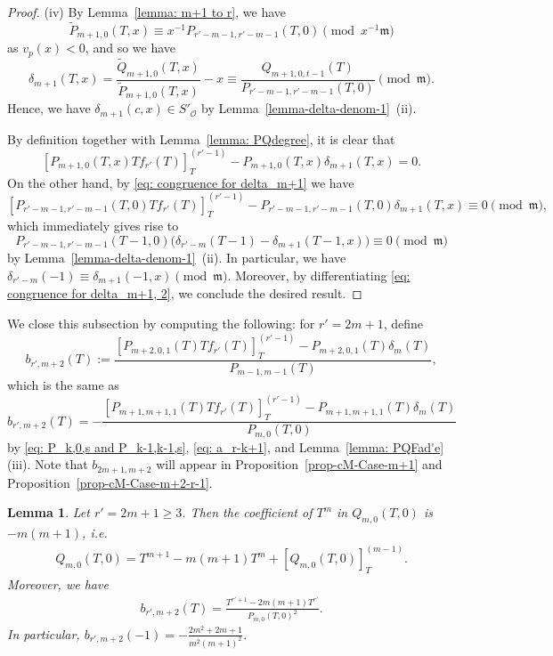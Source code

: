 \documentclass[11pt]{amsart}
\theoremstyle{definition}
\numberwithin{equation}{subsection}
\theoremstyle{plain}
\theoremstyle{plain}
\theoremstyle{plain}
\theoremstyle{plain}
\theoremstyle{plain}
\theoremstyle{plain}
\theoremstyle{plain}
\theoremstyle{plain}
\theoremstyle{plain}
\newtheorem{lemm}[equation]{Lemma}
\theoremstyle{plain}
\theoremstyle{plain}
\theoremstyle{plain}
\theoremstyle{definition}
\theoremstyle{definition}
\theoremstyle{definition}
\theoremstyle{remark}
\renewcommand{\(}{\textup{(}}
\renewcommand{\)}{\textup{)}}
\newcommand{\fm}{\mathfrak{m}}
\newcommand{\cO}{\mathcal{O}}
\begin{document}
\begin{proof}
(iv) By Lemma~\ref{lemma: m+1 to r}, we have
\begin{equation}\label{eq: congruence for delta_m+1}
\tilde{P}_{m+1,0}(T,x)\equiv x^{-1}P_{r'-m-1,r'-m-1}(T,0)\pmod{x^{-1}\fm}
\end{equation} as $v_p(x)<0$, and so we have
$$\delta_{m+1}(T,x)=\frac{\tilde{Q}_{m+1,0}(T,x)}{\tilde{P}_{m+1,0}(T,x)}-x\equiv \frac{Q_{m+1,0,t-1}(T)}{P_{r'-m-1,r'-m-1}(T,0)}\pmod{\fm}.$$
Hence, we have $\delta_{m+1}(c,x)\in S'_\cO$ by Lemma~\ref{lemma-delta-denom-1}~(ii).

By definition together with Lemma~\ref{lemma: PQdegree}, it is clear that $$[P_{m+1,0}(T,x)Tf_{r'}(T)]_T^{(r'-1)}-P_{m+1,0}(T,x)\delta_{m+1}(T,x)=0.$$ On the other hand, by \eqref{eq: congruence for delta_m+1} we have
$$[P_{r'-m-1,r'-m-1}(T,0)Tf_{r'}(T)]_T^{(r'-1)}-P_{r'-m-1,r'-m-1}(T,0)\delta_{m+1}(T,x)\equiv 0\pmod{\fm},$$
which immediately gives rise to
\begin{equation}\label{eq: congruence for delta_m+1, 2}
P_{r'-m-1,r'-m-1}(T-1,0)\big(\delta_{r'-m}(T-1)-\delta_{m+1}(T-1,x)\big)\equiv 0\pmod{\fm}
\end{equation}
by Lemma~\ref{lemma-delta-denom-1}~(ii). In particular, we have $\delta_{r'-m}(-1)\equiv\delta_{m+1}(-1,x)\pmod{\fm}$. Moreover, by differentiating \eqref{eq: congruence for delta_m+1, 2}, we conclude the desired result.
\end{proof}



We close this subsection by computing the following: for $r'=2m+1$, define
\begin{equation*}
b_{r',m+2}(T)
    :=\frac{[P_{m+2,0,1}(T)Tf_{r'}(T)]_{T}^{(r'-1)}-P_{m+2,0,1}(T)\delta_m(T)}{P_{m-1,m-1}(T)},
\end{equation*}
which is the same as
\begin{equation*}
    b_{r',m+2}(T)=-\frac{[P_{m+1,m+1,1}(T)Tf_{r'}(T)]_{T}^{(r'-1)}-P_{m+1,m+1,1}(T)\delta_m(T)}{P_{m,0}(T,0)}
\end{equation*}
by \eqref{eq: P_k,0,s and P_k-1,k-1,s}, \eqref{eq: a_r-k+1}, and Lemma~\ref{lemma: PQFad'e} (iii).
Note that $b_{2m+1,m+2}$ will appear in Proposition~\ref{prop-cM-Case-m+1} and Proposition~\ref{prop-cM-Case-m+2-r-1}.

\begin{lemm}\label{lemma-b-2m+1-m+2}
Let $r'=2m+1\geq 3$. Then the coefficient of $T^m$ in $Q_{m,0}(T,0)$ is $-m(m+1)$, i.e.
    \begin{align*}
        Q_{m,0}(T,0)=T^{m+1}-m(m+1)T^m+[Q_{m,0}(T,0)]_{T}^{(m-1)}.
    \end{align*}
Moreover, we have
    \begin{align*}
        b_{r',m+2}(T)
        =
        \frac{T^{r'+1}-2m(m+1)T^{r'}}{P_{m,0}(T,0)^2}.
    \end{align*}
    In particular, $b_{r',m+2}(-1)=-\frac{2m^2+2m+1}{m^2(m+1)^2}$.
\end{lemm}
\end{document}
